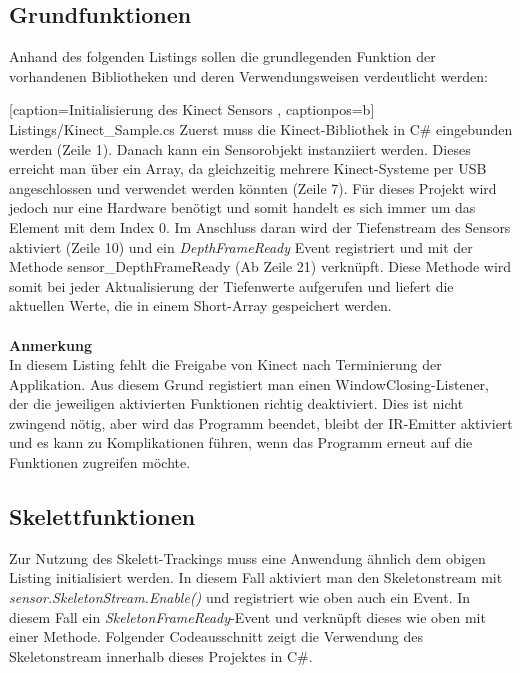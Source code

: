 %
%

\subsection{Grundfunktionen}
Anhand des folgenden Listings sollen die grundlegenden Funktion der vorhandenen Bibliotheken und deren Verwendungsweisen verdeutlicht werden:


    [caption={Initialisierung des Kinect Sensors \cite{pdf:maccormick}}
       \label{lst:kinect_sdk},
       captionpos=b]
 {Listings/Kinect_Sample.cs}
\noindent
Zuerst muss die Kinect-Bibliothek in C\# eingebunden werden (Zeile 1). Danach kann ein Sensorobjekt instanziiert werden. Dieses erreicht man über ein Array, da gleichzeitig mehrere Kinect-Systeme per USB angeschlossen und verwendet werden könnten (Zeile 7). Für dieses Projekt wird jedoch nur eine Hardware benötigt und somit handelt es sich immer um das Element mit dem Index 0. Im Anschluss daran wird der Tiefenstream des Sensors aktiviert (Zeile 10) und ein \textit{DepthFrameReady} Event registriert und mit der Methode sensor\_DepthFrameReady (Ab Zeile 21) verknüpft. Diese Methode wird somit bei jeder Aktualisierung der Tiefenwerte aufgerufen und liefert die aktuellen Werte, die in einem Short-Array gespeichert werden. \\ \\
\textbf{Anmerkung}\\
In diesem Listing fehlt die Freigabe von Kinect nach Terminierung der Applikation. Aus diesem Grund
registiert man einen WindowClosing-Listener, der die jeweiligen aktivierten Funktionen richtig deaktiviert. Dies ist nicht zwingend nötig, aber wird das Programm beendet, bleibt der IR-Emitter aktiviert und es kann zu Komplikationen führen, wenn das Programm erneut auf die Funktionen zugreifen möchte.

\subsection{Skelettfunktionen}
Zur Nutzung des Skelett-Trackings muss eine Anwendung ähnlich dem obigen Listing initialisiert werden.
In diesem Fall aktiviert man den Skeletonstream mit \textit{sensor.SkeletonStream.Enable()} und registriert wie oben auch ein Event. In diesem Fall ein \textit{SkeletonFrameReady}-Event und verknüpft dieses wie oben mit einer Methode. Folgender Codeausschnitt zeigt die Verwendung des Skeletonstream innerhalb dieses Projektes in C\#.\\

